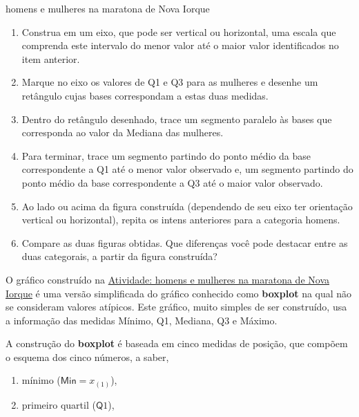 {{{\begin{task}{homens e mulheres na maratona de Nova Iorque}
\begin{enumerate}
\item {} 
Construa em um eixo, que pode ser vertical ou horizontal, uma escala que comprenda este intervalo do menor valor até o maior valor identificados no item anterior.

\item {} 
Marque no eixo os valores de Q1 e Q3  para as mulheres e desenhe um retângulo cujas bases correspondam a estas duas medidas.

\item {} 
Dentro do retângulo desenhado, trace um segmento paralelo às bases que corresponda ao valor da Mediana das mulheres.

\item {} 
Para terminar, trace um segmento partindo do ponto médio da base correspondente a Q1 até o menor valor observado e, um segmento partindo do ponto médio da base correspondente a Q3 até o maior valor observado.

\item {} 
Ao lado ou acima da figura construída (dependendo de seu eixo ter orientação vertical ou horizontal), repita os intens anteriores para a categoria homens.

\item {} 
Compare as duas figuras obtidas. Que diferenças você pode destacar entre as duas categorais, a partir da figura construída?

\end{enumerate}
\end{task}




\label{\detokenize{PE104-6:sec-organizandoasideias3}}\label{\detokenize{PE104-6:organizando-as-ideias-boxplot}}
O gráfico construído na \hyperref[\detokenize{PE104-6:ativ-construcao-do-boxplot}]{Atividade: homens e mulheres na maratona de Nova Iorque} é uma versão simplificada do gráfico conhecido como \textbf{boxplot} na qual não se consideram valores atípicos. Este gráfico, muito simples de ser construído, usa a informação das medidas Mínimo, Q1, Mediana, Q3 e Máximo.

A construção do \textbf{boxplot} é baseada em  cinco medidas de posição, que compõem o esquema dos cinco números, a saber,
\begin{enumerate}
\item {} 
mínimo (\(\textsf{Min}=x_{(1)}\)),

\item {} 
primeiro quartil (\(\textsf{Q}1\)),


\end{enumerate}}}}
